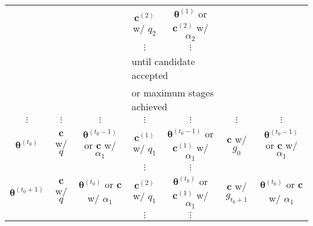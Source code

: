 \begin{sidewaystable}[h]
\begin{tabular}{|c||c|c||c|c||c|c|}
\cline{4-5}
                     &                         &                                         & $\mathbf{c}^{(2)}$ w/ $q_2$     & $\boldsymbol{\theta}^{(1)}$ or $\mathbf{c}^{(2)}$ w/ $\alpha_2$       &                  &                                         \\
\cline{4-5}
                     &                         &                                         & $\vdots$               & $\vdots$                                        &                  &                                         \\
\cline{4-5}
                     &                         &                                         & \multicolumn{2}{l||}{until candidate accepted}                           &                  &                                         \\
                     &                         &                                         & \multicolumn{2}{l||}{or maximum stages achieved}                         &                  &                                         \\
\hline
\hline
$\vdots$             & $\vdots$                & $\vdots$                                & $\vdots$               & $\vdots$                                        & $\vdots$         & $\vdots$                                \\
\hline
\hline
$\boldsymbol{\theta}^{(t_0)}$     & $\mathbf{c}$ w/ $q$              & $\boldsymbol{\theta}^{(t_0-1)}$ or $\mathbf{c}$ w/ $\alpha_1$     & $\mathbf{c}^{(1)}$ w/ $q_1$     & $\boldsymbol{\theta}^{(t_0-1)}$ or $\mathbf{c}^{(1)}$ w/ $\alpha_1$     & $\mathbf{c}$ w/ $g_0$     & $\boldsymbol{\theta}^{(t_0-1)}$ or $\mathbf{c}$ w/ $\alpha_1$     \\
\cline{4-5}
                     &                         &                                         & $\vdots$               & $\vdots$                                        &                  &                                         \\
\hline
\hline
$\boldsymbol{\theta}^{(t_0+1)}$   & $\mathbf{c}$ w/ $q$              & $\boldsymbol{\theta}^{(t_0)}$ or $\mathbf{c}$ w/ $\alpha_1$   & $\mathbf{c}^{(2)}$ w/ $q_1$     & $\boldsymbol{\theta}^{(t_0)}$ or $\mathbf{c}^{(1)}$ w/ $\alpha_1$   & $\mathbf{c}$ w/ $g_{t_0+1}$     & $\boldsymbol{\theta}^{(t_0)}$ or $\mathbf{c}$ w/ $\alpha_1$   \\
\cline{4-5}
                     &                         &                                         & $\vdots$               & $\vdots$                                        &                  &                                         \\

\end{tabular}
\end{sidewaystable}
